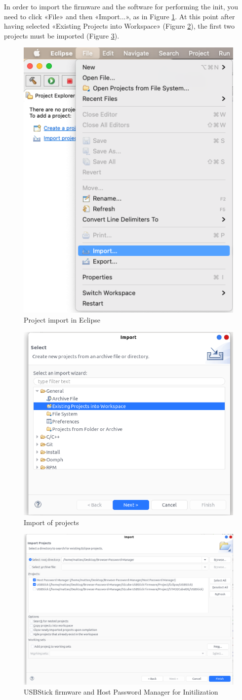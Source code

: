In order to import the firmware and the software for performing the init, you need to click «File» and then «Import...», as in Figure \ref{fig:setup6}. At this point after having selected «Existing Projects into Workspace» (Figure \ref{fig:setup7}), the first two projects must be imported (Figure \ref{fig:setup8}).
\begin{figure}[H]
	\centering
	\includegraphics[width=0.35\linewidth]{images/firmware/setup_6}
	\caption{Project import in Eclipse}
	\label{fig:setup6}
\end{figure}
\begin{figure}[H]
	\centering
	\includegraphics[width=0.55\linewidth]{images/firmware/setup_7}
	\caption{Import of projects}
	\label{fig:setup7}
\end{figure}

\begin{figure}[H]
	\centering
	\includegraphics[width=0.55\linewidth]{images/firmware/setup_8}
	\caption{USBStick firmware and Host Password Manager for Initilization}
	\label{fig:setup8}
\end{figure}

